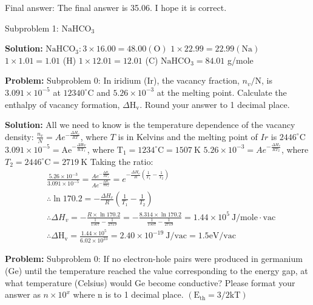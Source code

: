\documentclass[10pt]{article}
\begin{document}
Final answer: The final answer is 35.06. I hope it is correct.

Subproblem 1: $\mathrm{NaHCO}_{3}$


\textbf{Solution:}
$\mathrm{NaHCO}_{3}: 3 \times 16.00=48.00(\mathrm{O})$
$1 \times 22.99=22.99(\mathrm{Na})$
$1 \times 1.01=1.01$ (H)
$1 \times 12.01=12.01$ (C)
$\mathrm{NaHCO}_{3}= \boxed{84.01}$ g/mole


\textbf{Problem:}
Subproblem 0: In iridium (Ir), the vacancy fraction, $n_{v} / \mathrm{N}$, is $3.091 \times 10^{-5}$ at $12340^{\circ} \mathrm{C}$ and $5.26 \times 10^{-3}$ at the melting point. Calculate the enthalpy of vacancy formation, $\Delta \mathrm{H}_{\mathrm{v}}$. Round your answer to 1 decimal place. 


\textbf{Solution:}
All we need to know is the temperature dependence of the vacancy density:
$\frac{n_{v}}{N}=A e^{-\frac{\Delta H_{v}}{R T}}$, where $T$ is in Kelvins and the melting point of $I r$ is $2446^{\circ} \mathrm{C}$
$3.091 \times 10^{-5}=\mathrm{Ae}^{-\frac{\Delta \mathrm{H}_{\mathrm{V}}}{\mathrm{RT}_{1}}}$, where $\mathrm{T}_{1}=1234^{\circ} \mathrm{C}=1507 \mathrm{~K}$
$5.26 \times 10^{-3}=A e^{-\frac{\Delta H_{v}}{R T_{2}}}$, where $T_{2}=2446^{\circ} \mathrm{C}=2719 \mathrm{~K}$
Taking the ratio:
\[
\begin{aligned}
&\frac{5.26 \times 10^{-3}}{3.091 \times 10^{-5}}=\frac{A e^{-\frac{\Delta H_{v}}{R T_{1}}}}{A e^{-\frac{\Delta H_{v}}{R T_{2}}}}=e^{-\frac{\Delta H_{v}}{R}\left(\frac{1}{T_{1}}-\frac{1}{T_{2}}\right)} \\
&\therefore \ln 170.2=-\frac{\Delta H_{v}}{R}\left(\frac{1}{T_{1}}-\frac{1}{T_{2}}\right) \\
&\therefore \Delta H_{v}=-\frac{R \times \ln 170.2}{\frac{1}{1507}-\frac{1}{2719}}=-\frac{8.314 \times \ln 170.2}{\frac{1}{1507}-\frac{1}{2719}}=1.44 \times 10^{5} \mathrm{~J} / \mathrm{mole} \cdot \mathrm{vac} \\
&\therefore \Delta \mathrm{H}_{\mathrm{v}}=\frac{1.44 \times 10^{5}}{6.02 \times 10^{23}}=2.40 \times 10^{-19} \mathrm{~J} / \mathrm{vac}= \boxed{1.5} \mathrm{eV} / \mathrm{vac}
\end{aligned}
\]


\textbf{Problem:}
Subproblem 0: If no electron-hole pairs were produced in germanium (Ge) until the temperature reached the value corresponding to the energy gap, at what temperature (Celsius)  would Ge become conductive? Please format your answer as $n \times 10^x$ where n is to 1 decimal place. $\left(\mathrm{E}_{\mathrm{th}}=3 / 2 \mathrm{kT}\right)$
\end{document}

